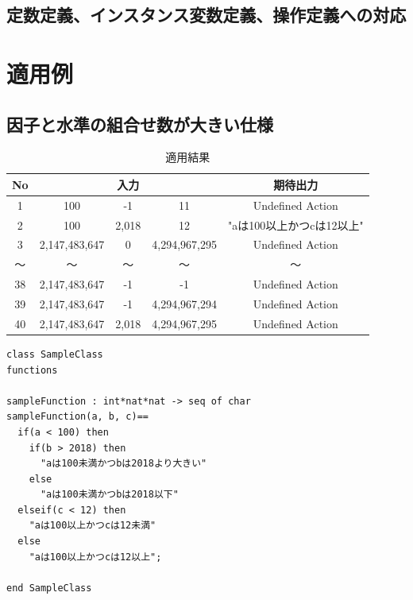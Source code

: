 \documentclass[uplatex, report, a4j, 10pt]{jsbook}
\begin{document}
\section{定数定義、インスタンス変数定義、操作定義への対応}

\chapter{適用例}\label{cha:Indication}
\section{因子と水準の組合せ数が大きい仕様}

\begin{table}[t]
  \begin{center}
    \caption{適用結果}
    \label{tab:pict4javaTekiyourei}
    \begin{tabular}{c|c|c|c|c}
      No & \multicolumn{3}{|c|}{入力} & 期待出力                                             \\
      \hline
      \hline
      1  & 100                        & -1       & 11            & Undefined Action          \\
      2  & 100                        & 2,018    & 12            & "aは100以上かつcは12以上" \\
      3  & 2,147,483,647              & 0        & 4,294,967,295 & Undefined Action          \\
      〜 & 〜                         & 〜       & 〜            & 〜                        \\
      38 & 2,147,483,647              & -1       & -1            & Undefined Action          \\
      39 & 2,147,483,647              & -1       & 4,294,967,294 & Undefined Action          \\
      40 & 2,147,483,647              & 2,018    & 4,294,967,295 & Undefined Action          \\
      \hline
    \end{tabular}
  \end{center}
\end{table}

\lstset{language=}
\begin{lstlisting}[caption=因子が3、水準が（6 6 6）の関数を持つVDM++仕様。,label=fig:pict4javaSampleVdm]
class SampleClass
functions

sampleFunction : int*nat*nat -> seq of char
sampleFunction(a, b, c)==
  if(a < 100) then
    if(b > 2018) then
      "aは100未満かつbは2018より大きい"
    else
      "aは100未満かつbは2018以下"
  elseif(c < 12) then
    "aは100以上かつcは12未満"
  else
    "aは100以上かつcは12以上";

end SampleClass
\end{lstlisting}
\end{document}
